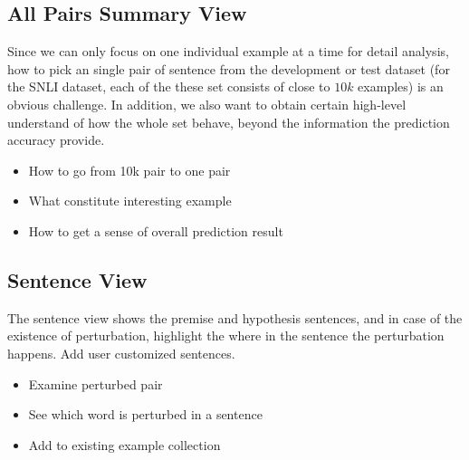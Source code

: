 \subsection{All Pairs Summary View}
\label{sec:allPairs}
Since we can only focus on one individual example at a time for detail analysis, 
how to pick an single pair of sentence from the development or test dataset (for the SNLI dataset, each of the these set consists of close to $10k$ examples) is an obvious challenge.
%
In addition, we also want to obtain certain high-level understand of how the whole set behave, beyond the information the prediction accuracy provide.

\begin{itemize}
\item How to go from 10k pair to one pair
\item What constitute interesting example
\item How to get a sense of overall prediction result
\end{itemize}

\subsection{Sentence View}
The sentence view shows the premise and hypothesis sentences, and in case of the existence of perturbation, highlight the where in the sentence the perturbation happens.
%
Add user customized sentences.

\begin{itemize}
\item Examine perturbed pair
\item See which word is perturbed in a sentence
\item Add to existing example collection
\end{itemize}
